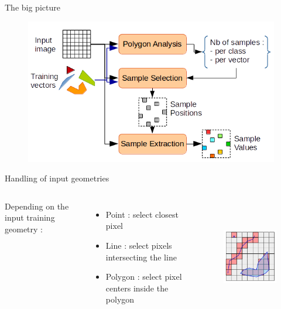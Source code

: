 \documentclass[smaller]{beamer}
\begin{document}
\begin{frame}{The big picture}
    
\begin{figure}[ht]
\begin{center}
\includegraphics[height=2.5in]{images/sampling_general.png}
\end{center}
\end{figure}

\end{frame}

\begin{frame}{Handling of input geometries}

\begin{columns}
Depending on the input training geometry :
\begin{itemize}
   \item Point : select closest pixel
   \item Line : select pixels intersecting the line
   \item Polygon : select pixel centers inside the polygon
\end{itemize}
\begin{figure}[ht]
\begin{center}
\includegraphics[height=2in]{images/sampling_geometry.png}
\end{center}
\end{figure}
\end{columns}

\end{frame}
\end{document}
